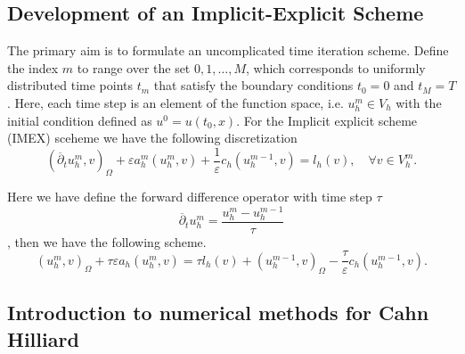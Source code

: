 \subsection{Development of an Implicit-Explicit Scheme}
\label{sub:implicit_explicit_scheme}

The primary aim is to formulate an uncomplicated time iteration scheme. Define the index $m$ to range over the set ${0, 1, \ldots, M}$, which corresponds to uniformly distributed time points $t_{m}$ that satisfy the boundary conditions $t_{0} = 0$
and $t_{M} = T$. Here, each time step is an element of the function space, i.e. $u^{m}_{h} \in V_{h}$  with the initial condition defined as $u^{0} = u( t_{0},x )$.
For the Implicit explicit scheme (IMEX) sceheme we have the following discretization
\[
( \overline{\partial } _{t} u^{m}_{h}, v   )_{\Omega } + \varepsilon a^{m}_{h}( u_{h}^{m} , v) + \frac{1}{\varepsilon } c_{h} (  u_{h}^{m-1}, v)  = l_{h}( v) , \quad \forall v \in V_{h}^{m}.
\]

Here we have define the forward difference operator with time step $\tau $
\[
\overline{\partial } _{t} u_{h}^{m} = \frac{u_{h}^{m} - u_{h}^{m-1}}{ \tau }
\]
, then we have the following scheme.
\[
( u_{h}^{m},v )_{\Omega }  + \tau \varepsilon a_{h}( u_{h}^{m} , v)   = \tau  l_{h}( v) +   ( u_{h}^{m-1},v )_{\Omega } - \frac{\tau}{\varepsilon } c_{h} (  u_{h}^{m-1}, v) .
\]



\subsection{Introduction to numerical methods for Cahn Hilliard}%
\label{sub:introduction_to_numerical_methods_for_cahn_hilliard}

